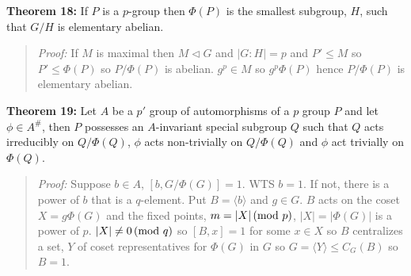 {\bf Theorem 18:} If $P$ is a $p$-group then $\Phi(P)$ is the smallest subgroup, $H$, such that
$G/H$ is elementary abelian.
\begin{quote}
\emph{Proof:}  
If $M$ is maximal then $M \lhd G$ and $|G:H|=p$ and $P' \leq M$ so $P' \leq \Phi(P)$ so
$P/ \Phi(P)$ is abelian.  $g^p \in M$ so $g^p \Phi(P)$ hence $P/ \Phi(P)$ is elementary abelian.
\end{quote}
{\bf Theorem 19:}
Let $A$ be a $p'$ group of  automorphisms of a $p$ group $P$ and let $\phi \in A^{\#}$,
then $P$ possesses an $A$-invariant special subgroup $Q$ such that $Q$ acts irreducibly
on $Q/\Phi(Q)$, $\phi$ acts non-trivially on  $Q/\Phi(Q)$ and $\phi$ act trivially on
$\Phi(Q)$.
\begin{quote}
\emph{Proof:}  
Suppose $b \in A$, $[b,G/\Phi(G)]=1$.  WTS $b=1$.  If not, there is a power of $b$ that
is a $q$-element.  Put $B= \langle b \rangle$ and $g \in G$.  $B$ acts on the coset
$X= g \Phi(G)$ and the fixed points, $m= |X| \thinspace \textnormal{(mod } p \textnormal{)}$, $|X|= |\Phi(G)|$ is a power of $p$.
$|X| \neq 0 \thinspace \textnormal{(mod } q \textnormal{)}$ so $[B,x]=1$ for some $x \in X$ so $B$ centralizes a set, $Y$ of
coset representatives for $\Phi(G)$ in $G$ so $G= \langle Y \rangle \leq C_G(B)$
so $B=1$.
\end{quote}

